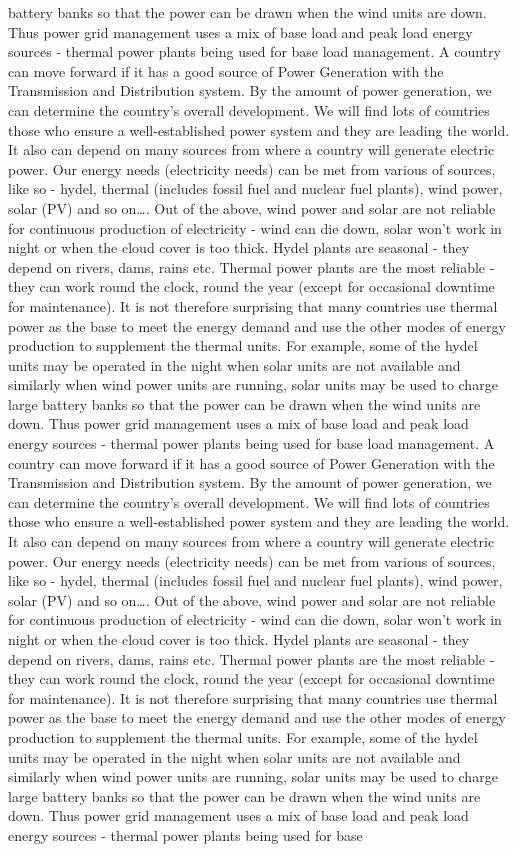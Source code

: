 \documentclass[10pt, a4paper]{article}
\begin{document}
battery banks so that the power can be drawn when the wind units are down. Thus power grid management uses a mix of base load and peak load energy sources - thermal power plants being used for base load management. A country can move forward if it has a good source of Power Generation with the Transmission and Distribution system. By the amount of power generation, we can determine the country’s overall development. We will find lots of countries those who ensure a well-established power system and they are leading the world. It also can depend on many sources from where a country will generate electric power. Our energy needs (electricity needs) can be met from various of sources, like so - hydel, thermal (includes fossil fuel and nuclear fuel plants), wind power, solar (PV) and so on\dots. Out of the above, wind power and solar are not reliable for continuous production of electricity - wind can die down, solar won’t work in night or when the cloud cover is too thick. Hydel plants are seasonal - they depend on rivers, dams, rains etc. Thermal power plants are the most reliable - they can work round the clock, round the year (except for occasional downtime for maintenance). It is not therefore surprising that many countries use thermal power as the base to meet the energy demand and use the other modes of energy production to supplement the thermal units. For example, some of the hydel units may be operated in the night when solar units are not available and similarly when wind power units are running, solar units may be used to charge large battery banks so that the power can be drawn when the wind units are down. Thus power grid management uses a mix of base load and peak load energy sources - thermal power plants being used for base load management. A country can move forward if it has a good source of Power Generation with the Transmission and Distribution system. By the amount of power generation, we can determine the country’s overall development. We will find lots of countries those who ensure a well-established power system and they are leading the world. It also can depend on many sources from where a country will generate electric power. Our energy needs (electricity needs) can be met from various of sources, like so - hydel, thermal (includes fossil fuel and nuclear fuel plants), wind power, solar (PV) and so on\dots. Out of the above, wind power and solar are not reliable for continuous production of electricity - wind can die down, solar won’t work in night or when the cloud cover is too thick. Hydel plants are seasonal - they depend on rivers, dams, rains etc. Thermal power plants are the most reliable - they can work round the clock, round the year (except for occasional downtime for maintenance). It is not therefore surprising that many countries use thermal power as the base to meet the energy demand and use the other modes of energy production to supplement the thermal units. For example, some of the hydel units may be operated in the night when solar units are not available and similarly when wind power units are running, solar units may be used to charge large battery banks so that the power can be drawn when the wind units are down. Thus power grid management uses a mix of base load and peak load energy sources - thermal power plants being used for base 
\end{document}
